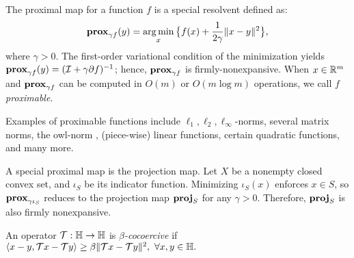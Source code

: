 \begin{definition}\label{def-prox-map}
The proximal map for a function $f$ is a special resolvent defined as:
\begin{equation}\label{def-prox}\prox_{\gamma f}(y) = \argmin_x \big\{f(x)+\frac{1}{2\gamma}\|x-y\|^2 \big\},
\end{equation}
where $\gamma > 0$. The first-order variational condition of the minimization yields $\mathbf{prox}_{\gamma f}(y)=({\mathcal{I}}+\gamma\partial f)^{-1}$; hence, $\mathbf{prox}_{\gamma f}$ is firmly-nonexpansive. When $x\in\mathbb{R}^m$ and $\mathbf{prox}_{\gamma f}$ can be computed in $O(m)$ or $O(m\log m)$ operations, we call $f$ \emph{proximable}.

Examples of proximable functions include $\ell_1,\ell_2,\ell_\infty$-norms, several matrix norms, the owl-norm \cite{davis2015n}, (piece-wise) linear functions, certain quadratic functions, and many more.
\end{definition}

\begin{example}
 A special proximal map is the projection map. Let $X$ be a nonempty closed convex set, and $\iota_S$ be its indicator function. Minimizing $\iota_S(x)$  enforces $x\in S$,  so $\mathbf{prox}_{\gamma \iota_S}$ reduces to the projection map ${\mathbf{proj}}_{S}$ for any $\gamma>0$. Therefore, ${\mathbf{proj}}_{S}$ is also firmly nonexpansive.
 \end{example}


\begin{definition}
An operator ${\mathcal{T}}:\mathbb{H}\to\mathbb{H}$ is \emph{$\beta$-cocoercive} if 
$\langle x-y, {\mathcal{T}} x-{\mathcal{T}} y\rangle \ge \beta \|{\mathcal{T}} x-{\mathcal{T}} y\|^2,\ \forall x,y\in\mathbb{H}.$ 
\end{definition}

